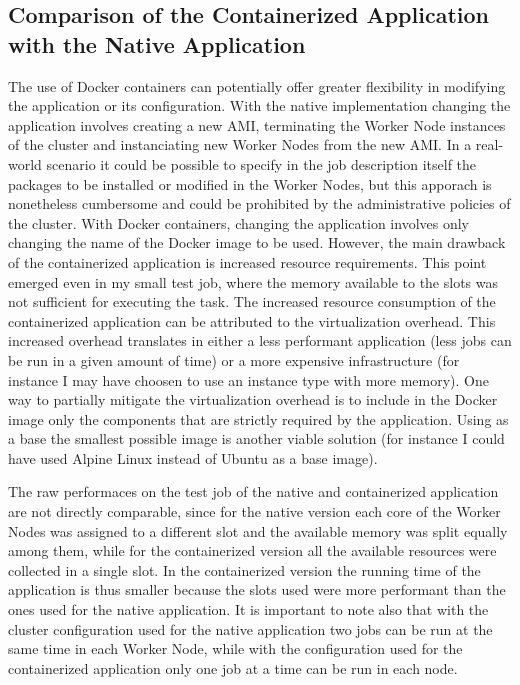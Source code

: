 \documentclass{article}
\begin{document}
\subsection{Comparison of the Containerized Application with the Native Application}
The use of Docker containers can potentially offer greater flexibility in modifying the application or its configuration.
With the native implementation changing the application involves creating a new AMI, terminating the Worker Node instances of the cluster and instanciating new Worker Nodes from the new AMI.
In a real-world scenario it could be possible to specify in the job description itself the packages to be installed or modified in the Worker Nodes, but this apporach is nonetheless cumbersome and could be prohibited by the administrative policies of the cluster.
With Docker containers, changing the application involves only changing the name of the Docker image to be used.
However, the main drawback of the containerized application is increased resource requirements.
This point emerged even in my small test job, where the memory available to the slots was not sufficient for executing the task.
The increased resource consumption of the containerized application can be attributed to the virtualization overhead.
This increased overhead translates in either a less performant application (less jobs can be run in a given amount of time) or a more expensive infrastructure (for instance I may have choosen to use an instance type with more memory).
One way to partially mitigate the virtualization overhead is to include in the Docker image only the components that are strictly required by the application.
Using as a base the smallest possible image is another viable solution (for instance I could have used Alpine Linux instead of Ubuntu as a base image).

The raw performaces on the test job of the native and containerized application are not directly comparable, since for the native version each core of the Worker Nodes was assigned to a different slot and the available memory was split equally among them, while for the containerized version all the available resources were collected in a single slot.
In the containerized version the running time of the application is thus smaller because the slots used were more performant than the ones used for the native application.
It is important to note also that with the cluster configuration used for the native application two jobs can be run at the same time in each Worker Node, while with the configuration used for the containerized application only one job at a time can be run in each node.
\end{document}
